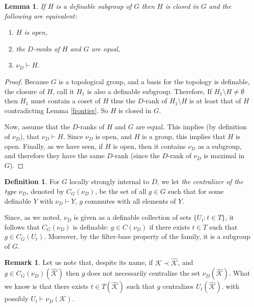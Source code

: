\documentclass[11pt]{amsart}
\newtheorem{lemma}[theorem]{Lemma}
\theoremstyle{definition}
\newtheorem{definition}[theorem]{Definition}
\newtheorem{remark}[theorem]{Remark}
\newcommand{\CK}{{\mathcal K}}
\newcommand{\0}{\emptyset}
\begin{document}
\begin{lemma}\label{L:groups are closed, open iff full D-rank}
If $H$ is a definable subgroup of $G$ then $H$ is closed in $G$ and
the following are equivalent:
\begin{enumerate}
    \item $H$ is open,
    \item the $D$-ranks of $H$ and $G$ are equal, 
    \item $\nu_D\vdash H$.
\end{enumerate}
\end{lemma}
\begin{proof}
Because $G$ is a topological group, and a basis for the topology is definable, the closure of $H$, call it $H_1$ is also a definable subgroup. Therefore, If $H_1\setminus H\neq \emptyset$ then $H_1$ must contain a coset of $H$ thus the $D$-rank of $H_1\setminus H$ is at least that of $H$ contradicting  Lemma \ref{frontier}. So $H$ is closed in $G$.

Now, assume that the $D$-ranks of $H$ and $G$ are equal. This implies (by definition of $\nu_D$),  that $\nu_D\vdash H$. Since $\nu_D$ is open, and $H$ is a group, this implies that  $H$ is open. Finally, as we have seen, if $H$ is open, then it contains $\nu_D$ as a subgroup, and therefore they have the same $D$-rank (since the $D$-rank of $\nu_D$ is maximal in $G$). 
\end{proof}

\begin{definition} \label{D: centralizer}
For $G$ locally strongly internal to $D$,  we let {\em the centralizer of the type $\nu_D$}, denoted by $C_G(\nu_D)$, be the set of all $g\in G$ such that for some definable $Y$ with $\nu_D\vdash Y$, $g$ commutes with all elements of $Y$.
\end{definition}


Since, as we noted, $\nu_D$ is given as a definable collection of sets $\{U_t:t\in T\}$, it 
follows that $C_G(\nu_D)$ is definable: $g\in C(\nu_D)$ if there exists $t\in T$ such that $g\in C_G(U_t)$. Moreover, by the filter-base property of the family, it is a subgroup of $G$. 

\begin{remark}
 Let us note that,  despite its name, if $\CK\prec \hat \CK$, and $g\in C_G(\nu_D)(\hat \CK)$ then $g$ does not necessarily centralize the set $\nu_D(\hat \CK)$. What we know is that  there exists $t\in T(\hat \CK)$ such that $g$ centralizes $U_t(\hat \CK)$. with possibly $U_t\vdash \nu_D(\CK)$.
\end{remark}
\end{document}
